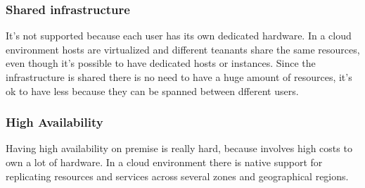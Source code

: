 \subsubsection{Shared infrastructure}
It's not supported because each user has its own dedicated hardware. \n
In a cloud environment hosts are virtualized and different teanants share the same resources, even though it's possible to have dedicated hosts or instances. Since the infrastructure is shared there is no need to have a huge amount of resources, it's ok to have less because they can be spanned between dfferent users.
\subsubsection{High Availability}
Having high availability on premise is really hard, because involves high costs to own a lot of hardware. \n
In a cloud environment there is native support for replicating resources and services across several zones and geographical regions.
